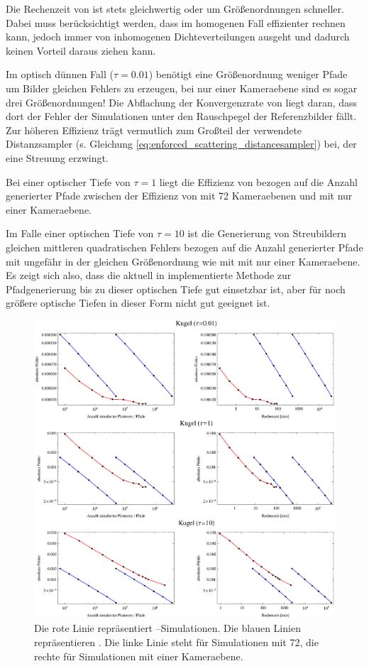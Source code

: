 	Die Rechenzeit von \pirate ist stets gleichwertig oder um Größenordnungen schneller. Dabei muss berücksichtigt werden, dass \pirate im homogenen Fall effizienter rechnen kann, \mctd jedoch immer von inhomogenen Dichteverteilungen ausgeht und dadurch keinen Vorteil daraus ziehen kann.
	
	Im optisch dünnen Fall ($\tau=0.01$) benötigt \pirate eine Größenordnung weniger Pfade um Bilder gleichen Fehlers zu erzeugen, bei nur einer Kameraebene sind es sogar drei Größenordnungen! Die Abflachung der Konvergenzrate von \pirate liegt daran, dass dort der Fehler der Simulationen unter den Rauschpegel der Referenzbilder fällt. Zur höheren Effizienz trägt vermutlich zum Großteil der verwendete Distanzsampler (s. Gleichung \ref{eq:enforced_scattering_distancesampler}) bei, der eine Streuung erzwingt.
	
	Bei einer optischer Tiefe von $\tau=1$ liegt die Effizienz von \pirate bezogen auf die Anzahl generierter Pfade zwischen der Effizienz von \mctd mit 72 Kameraebenen und \mctd mit nur einer Kameraebene.
	
	Im Falle einer optischen Tiefe von $\tau=10$ ist die Generierung von Streubildern gleichen mittleren quadratischen Fehlers bezogen auf die Anzahl generierter Pfade mit \pirate ungefähr in der gleichen Größenordnung wie mit \mctd mit nur einer Kameraebene. Es zeigt sich also, dass die aktuell in \pirate implementierte Methode zur Pfadgenerierung bis zu dieser optischen Tiefe gut einsetzbar ist, aber für noch größere optische Tiefen in dieser Form nicht gut geeignet ist.

		\begin{figure}
			\centering
			\includegraphics[width=1.0\textwidth]{sphereerrorplots.eps}
			\caption{Die rote Linie repräsentiert \pirate--Simulationen. Die blauen Linien repräsentieren \mctd. Die linke Linie steht für Simulationen mit 72, die rechte für Simulationen mit einer Kameraebene.}
			\label{fig:sphere_errors}
		\end{figure}



